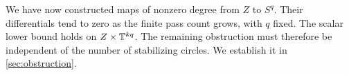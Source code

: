 We have now constructed maps of nonzero degree from $Z$ to $S^q$.
Their differentials tend to zero as the finite pass count grows, with
$q$ fixed. The scalar lower bound holds on $Z\times\mathbb T^{kq}$. The
remaining obstruction must therefore be independent of the number of
stabilizing circles. We establish it in \cref{sec:obstruction}.
